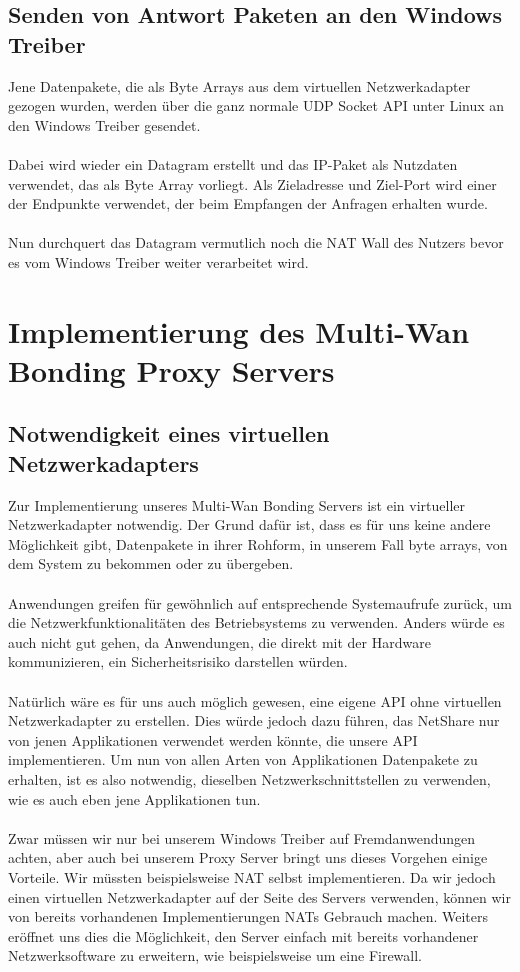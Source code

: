 \subsection{Senden von Antwort Paketen an den Windows Treiber}
Jene Datenpakete, die als Byte Arrays aus dem virtuellen Netzwerkadapter gezogen wurden, werden über die ganz normale UDP Socket API unter Linux an den Windows Treiber gesendet. 
\\\\
Dabei wird wieder ein Datagram erstellt und das IP-Paket als Nutzdaten verwendet, das als Byte Array vorliegt. Als Zieladresse und Ziel-Port wird einer der Endpunkte verwendet, der beim Empfangen der Anfragen erhalten wurde.
\\\\
Nun durchquert das Datagram vermutlich noch die NAT Wall des Nutzers bevor es vom Windows Treiber weiter verarbeitet wird. 


\section{Implementierung des Multi-Wan Bonding Proxy Servers}
\subsection{Notwendigkeit eines virtuellen Netzwerkadapters}
Zur Implementierung unseres Multi-Wan Bonding Servers ist ein virtueller Netzwerkadapter notwendig. Der Grund dafür ist, dass es für uns keine andere Möglichkeit gibt, Datenpakete in ihrer Rohform, in unserem Fall byte arrays, von dem System zu bekommen oder zu übergeben. 
\\\\
Anwendungen greifen für gewöhnlich auf entsprechende Systemaufrufe zurück, um die Netzwerkfunktionalitäten des Betriebsystems zu verwenden. Anders würde es auch nicht gut gehen, da Anwendungen, die direkt mit der Hardware kommunizieren, ein Sicherheitsrisiko darstellen würden.
\\\\
Natürlich wäre es für uns auch möglich gewesen, eine eigene API ohne virtuellen Netzwerkadapter zu erstellen. Dies würde jedoch dazu führen, das NetShare nur von jenen Applikationen verwendet werden könnte, die unsere API implementieren. Um nun von allen Arten von Applikationen Datenpakete zu erhalten, ist es also notwendig, dieselben Netzwerkschnittstellen zu verwenden, wie es auch eben jene Applikationen tun.  
\\\\
Zwar müssen wir nur bei unserem Windows Treiber auf Fremdanwendungen achten, aber auch bei unserem Proxy Server bringt uns dieses Vorgehen einige Vorteile. Wir müssten beispielsweise NAT selbst implementieren. Da wir jedoch einen virtuellen Netzwerkadapter auf der Seite des Servers verwenden, können wir von bereits vorhandenen Implementierungen NATs Gebrauch machen. Weiters eröffnet uns dies die Möglichkeit, den Server einfach mit bereits vorhandener Netzwerksoftware zu erweitern, wie beispielsweise um eine Firewall.
